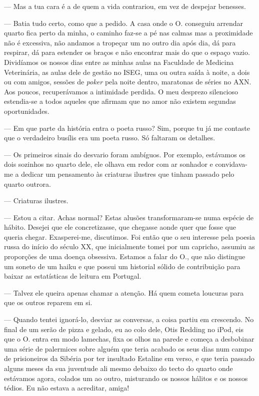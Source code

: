 --- Mas a tua cara é a de quem a vida contrariou, em vez de despejar
  benesses.

--- Batia tudo certo, como que a pedido. A casa onde o
O. conseguiu arrendar quarto fica perto da minha, o caminho faz-se a
pé nas calmas mas a proximidade não é excessiva, não andamos a tropeçar
um no outro dia após dia, dá para respirar, dá para estender os braços e
não encontrar mais do que o espaço vazio. Dividíamos os nossos dias
entre as minhas aulas na Faculdade de Medicina Veterinária, as aulas
dele de gestão no ISEG, uma ou outra saída à noite, a dois ou com
amigos, sessões de \emph{poker }pela noite dentro, maratonas de séries
no AXN. Aos poucos, recuperávamos a intimidade perdida. O meu desprezo
silencioso estendia-se a todos aqueles que afirmam que no amor não
existem segundas oportunidades.

--- Em que parte da história entra o poeta russo? Sim, porque tu já me
  contaste que o verdadeiro busílis era um poeta russo. Só faltaram os
  detalhes.

--- Os primeiros sinais do desvario foram ambíguos. Por exemplo, estávamos
  os dois sozinhos no quarto dele, ele olhava em redor com ar sonhador e
  convidava-me a dedicar um pensamento às criaturas ilustres que
  tinham passado pelo quarto outrora.

--- Criaturas ilustres.

--- Estou a citar. Achas normal? Estas alusões transformaram-se numa
  espécie de hábito. Desejei que ele concretizasse, que chegasse aonde
  quer que fosse que queria chegar. Exasperei-me, discutimos. Foi
  então que o seu interesse pela poesia russa do início do século XX,
  que inicialmente tomei por um capricho, assumiu as proporções de uma
  doença obsessiva. Estamos a falar do O., que não distingue um soneto
  de um haiku e que possui um historial sólido de contribuição para
baixar as estatísticas de leitura em Portugal.

--- Talvez ele queira apenas chamar a atenção. Há quem cometa loucuras
  para que os outros reparem em si.

--- Quando tentei ignorá-lo, desviar as conversas, a coisa partiu em
  crescendo. No final de um serão de pizza e gelado, eu ao colo dele,
  Otis Redding no iPod, eis que o O. entra em modo lamechas, fixa os
  olhos na parede e começa a desbobinar uma série de palermices sobre
  alguém que teria acabado os seus dias num campo de prisioneiros da
  Sibéria por ter insultado Estaline em verso, e que teria passado
  alguns meses da sua juventude ali mesmo debaixo do tecto do quarto
  onde estávamos agora, colados um ao outro, misturando os nossos
  hálitos e os nossos tédios. Eu não estava a acreditar, amiga!


